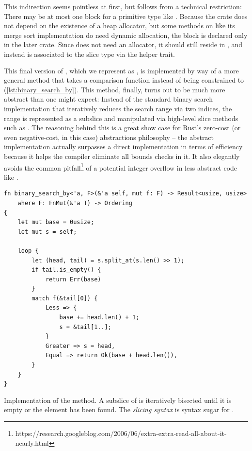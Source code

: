 This indirection seems pointless at first, but follows from a technical
restriction: There may be at most one  block for a primitive type
like \rust{[T]}. Because the  crate does not depend on the existence
of a heap allocator, but some methods on \rust{[T]} like its merge sort
implementation do need dynamic allocation, the  block is
declared only in the later  crate. Since  does
not need an allocator, it should still reside in , and instead is
associated to the slice type via the helper trait.

This final version of , which we represent as
, is implemented by way of a more
general method  that takes a comparison function instead
of being constrained to  (\autoref{lst:binary_search_by}). This
method, finally, turns out to be much more abstract than one might expect: Instead of
the standard binary search implementation that iteratively reduces the search range via two
indices, the range is represented as a subslice and manipulated via high-level
slice methods such as . The reasoning behind this is a great show
case for Rust's zero-cost (or even negative-cost, in this case) abstractions
philosophy -- the abstract implementation actually surpasses a direct
implementation in terms of efficiency because it helps the compiler eliminate
all bounds checks in it. It also elegantly avoids the common
pitfall\footnote{https://research.googleblog.com/2006/06/extra-extra-read-all-about-it-nearly.html}
of a potential integer overflow in less abstract code like .

\begin{listing}[bp]
\begin{verbatim}
fn binary_search_by<'a, F>(&'a self, mut f: F) -> Result<usize, usize>
    where F: FnMut(&'a T) -> Ordering
{
    let mut base = 0usize;
    let mut s = self;

    loop {
        let (head, tail) = s.split_at(s.len() >> 1);
        if tail.is_empty() {
            return Err(base)
        }
        match f(&tail[0]) {
            Less => {
                base += head.len() + 1;
                s = &tail[1..];
            }
            Greater => s = head,
            Equal => return Ok(base + head.len()),
        }
    }
}
\end{verbatim}
  
\caption{Implementation of the  method. A subslice
   of  is iteratively bisected until it is empty or the
  element has been found. The  \emph{slicing syntax} is
  syntax sugar for .}
\label{lst:binary_search_by}
\end{listing}

